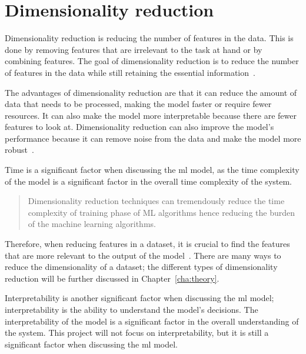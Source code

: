 

\section{Dimensionality reduction}\label{sec:dimensionality-reduction-problem}

Dimensionality reduction is reducing the number of features in the data. This is done by removing features that are irrelevant to the task at hand or by combining features. The goal of dimensionality reduction is to reduce the number of features in the data while still retaining the essential information~\cite{dimensionality-reduction-cheng}.

The advantages of dimensionality reduction are that it can reduce the amount of data that needs to be processed, making the model faster or require fewer resources. It can also make the model more interpretable because there are fewer features to look at. Dimensionality reduction can also improve the model's performance because it can remove noise from the data and make the model more robust~\cite{dimensionality-reduction-cheng}.

Time is a significant factor when discussing the \gls{ml} model, as the time complexity of the model is a significant factor in the overall time complexity of the system.

\blockcquote{Analysis-of-Dimensionality-Reduction-Techniques-on-Big-Data}{Dimensionality reduction techniques can tremendously reduce the time complexity of training phase of ML algorithms hence reducing the burden of the machine learning algorithms.}.

Therefore, when reducing features in a dataset, it is crucial to find the features that are more relevant to the output of the model~\cite{Feature-engineering-zheng}. There are many ways to reduce the dimensionality of a dataset; the different types of dimensionality reduction will be further discussed in Chapter~\ref{cha:theory}.



Interpretability is another significant factor when discussing the \gls{ml} model; interpretability is the ability to understand the model's decisions. The interpretability of the model is a significant factor in the overall understanding of the system. This project will not focus on interpretability, but it is still a significant factor when discussing the \gls{ml} model.

